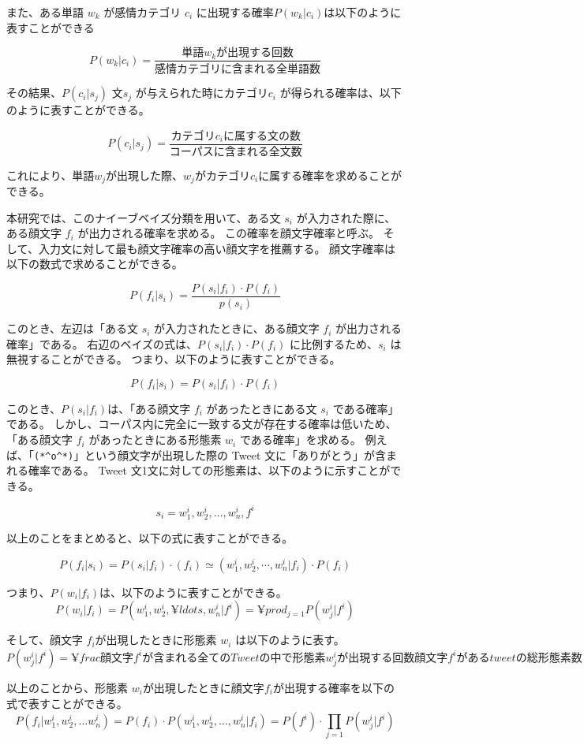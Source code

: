 \documentclass[11pt,a4j]{jsarticle}
\begin{document}
また、ある単語 $w_k$ が感情カテゴリ $c_i$ に出現する確率$P(w_k|c_i)$は以下のように表すことができる

\[
P(w_k|c_i)=\frac{単語 w_k が出現する回数}{感情カテゴリに含まれる全単語数}
\]

その結果、$P(c_i|s_j)$ 文$s_j$ が与えられた時にカテゴリ$c_i$ が得られる確率は、以下のように表すことができる。

\[
P(c_i|s_j)=\frac{カテゴリc_i に属する文の数}{コーパスに含まれる全文数}
\]

これにより、単語$w_j$が出現した際、$w_j$がカテゴリ$c_i$に属する確率を求めることができる。

本研究では、このナイーブベイズ分類を用いて、ある文 $s_i$ が入力された際に、ある顔文字 $f_i$ が出力される確率を求める。
この確率を顔文字確率と呼ぶ。
そして、入力文に対して最も顔文字確率の高い顔文字を推薦する。
顔文字確率は以下の数式で求めることができる。


\[
  P(f_i|s_i)=\frac{P(s_i|f_i) \cdot P(f_i)}{p(s_i)}
\]

このとき、左辺は「ある文 $s_i$ が入力されたときに、ある顔文字 $f_i$ が出力される確率」である。
右辺のベイズの式は、$P(s_i|f_i) \cdot P(f_i)$ に比例するため、$s_i$ は無視することができる。
つまり、以下のように表すことができる。

\[
  P(f_i|s_i)=P(s_i|f_i) \cdot P(f_i)
\]

このとき、$P(s_i|f_i)$は、「ある顔文字 $f_i$ があったときにある文 $s_i$ である確率」である。
しかし、コーパス内に完全に一致する文が存在する確率は低いため、「ある顔文字 $f_i$ があったときにある形態素 $w_i$ である確率」を求める。
例えば、「\verb|(*^o^*)|」という顔文字が出現した際の Tweet 文に「ありがとう」が含まれる確率である。
Tweet 文1文に対しての形態素は、以下のように示すことができる。

\[
s_i = w_1^i,w_2^i,\ldots,w_n^i,f^i
\]


以上のことをまとめると、以下の式に表すことができる。

\[
  P(f_i|s_i)=P(s_i|f_i) \cdot (f_i) \simeq (w^i_1,w^i_2, \cdots,w^i_n|f_i)\cdot P(f_i)
\]

つまり、$P(w_i|f_i)$は、以下のように表すことができる。
\[
P(w_i|f_i) = P(w^i_1,w^i_2,¥ldots,w^i_n|f^i) = ¥prod_{j=1} P(w^i_j|f^i)
\]

そして、顔文字 $f_i$が出現したときに形態素 $w_i$ は以下のように表す。
\[
P(w^i_j|f^i) = ¥frac{顔文字 f^i が含まれる全てのTweetの中で形態素 w^i_j が出現する回数}{顔文字 f^i があるtweetの総形態素数}
\]

以上のことから、形態素 $w_i$が出現したときに顔文字$f_i$が出現する確率を以下の式で表すことができる。
\[
  P(f_i|w^i_1,w^i_2, \dots w^i_n) = P(f_i) \cdot P(w^i_1,w^i_2, \dots ,w^i_n|f_i) = P(f^i) \cdot \prod_{j=1} P(w^i_j|f^i)
\]
\end{document}
